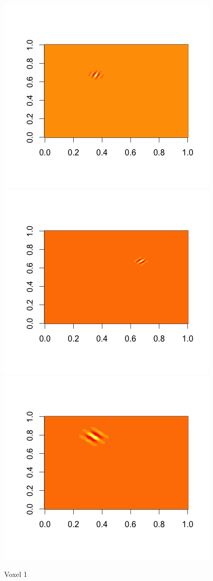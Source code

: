 \documentclass[english]{amsart}
\begin{document}
\begin{figure}[H]
  \includegraphics[width=\linewidth, height = 150pts]{voxel1_wave3.png}
\endminipage\hfill
\vspace{-5mm}
  \includegraphics[width=\linewidth, height = 150pts]{voxel1_wave5.png}
\endminipage\hfill
{}
  \includegraphics[width=\linewidth, height = 150pts]{voxel1_wave7.png}
\endminipage
  \caption{Voxel 1}
\end{figure}
\end{document}
